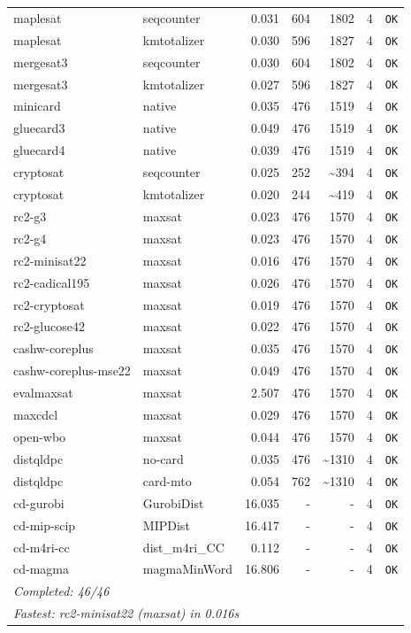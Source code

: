 \begin{longtable}{llrrrl p{}}
maplesat & seqcounter & 0.031 & 604 & 1802 & 4 & \texttt{OK} \\
maplesat & kmtotalizer & 0.030 & 596 & 1827 & 4 & \texttt{OK} \\
mergesat3 & seqcounter & 0.030 & 604 & 1802 & 4 & \texttt{OK} \\
mergesat3 & kmtotalizer & 0.027 & 596 & 1827 & 4 & \texttt{OK} \\
minicard & native & 0.035 & 476 & 1519 & 4 & \texttt{OK} \\
gluecard3 & native & 0.049 & 476 & 1519 & 4 & \texttt{OK} \\
gluecard4 & native & 0.039 & 476 & 1519 & 4 & \texttt{OK} \\
cryptosat & seqcounter & 0.025 & 252 & \textasciitilde{}394 & 4 & \texttt{OK} \\
cryptosat & kmtotalizer & 0.020 & 244 & \textasciitilde{}419 & 4 & \texttt{OK} \\
rc2-g3 & maxsat & 0.023 & 476 & 1570 & 4 & \texttt{OK} \\
rc2-g4 & maxsat & 0.023 & 476 & 1570 & 4 & \texttt{OK} \\
rc2-minisat22 & maxsat & 0.016 & 476 & 1570 & 4 & \texttt{OK} \\
rc2-cadical195 & maxsat & 0.026 & 476 & 1570 & 4 & \texttt{OK} \\
rc2-cryptosat & maxsat & 0.019 & 476 & 1570 & 4 & \texttt{OK} \\
rc2-glucose42 & maxsat & 0.022 & 476 & 1570 & 4 & \texttt{OK} \\
cashw-coreplus & maxsat & 0.035 & 476 & 1570 & 4 & \texttt{OK} \\
cashw-coreplus-mse22 & maxsat & 0.049 & 476 & 1570 & 4 & \texttt{OK} \\
evalmaxsat & maxsat & 2.507 & 476 & 1570 & 4 & \texttt{OK} \\
maxcdcl & maxsat & 0.029 & 476 & 1570 & 4 & \texttt{OK} \\
open-wbo & maxsat & 0.044 & 476 & 1570 & 4 & \texttt{OK} \\
distqldpc & no-card & 0.035 & 476 & \textasciitilde{}1310 & 4 & \texttt{OK} \\
distqldpc & card-mto & 0.054 & 762 & \textasciitilde{}1310 & 4 & \texttt{OK} \\
cd-gurobi & GurobiDist & 16.035 & - & - & 4 & \texttt{OK} \\
cd-mip-scip & MIPDist & 16.417 & - & - & 4 & \texttt{OK} \\
cd-m4ri-cc & dist\_m4ri\_CC & 0.112 & - & - & 4 & \texttt{OK} \\
cd-magma & magmaMinWord & 16.806 & - & - & 4 & \texttt{OK} \\
\midrule
\multicolumn{7}{l}{\textit{Completed: 46/46}} \\
\multicolumn{7}{l}{\textit{Fastest: rc2-minisat22 (maxsat) in 0.016s}} \\
\end{longtable}
